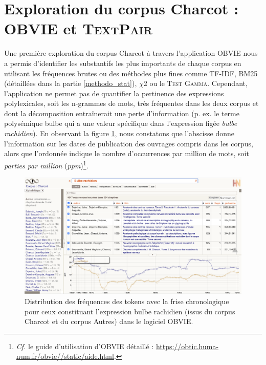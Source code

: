 \label{resultats}
\section{Exploration du corpus Charcot : \textsc{OBVIE} et \textsc{TextPair}}
Une première exploration du corpus Charcot à travers l'application OBVIE nous a permis d'identifier les substantifs les plus importants de chaque corpus en utilisant les fréquences brutes ou des méthodes plus fines comme \textsc{TF-IDF}, \textsc{BM25} (détaillées dans la partie \ref{methodo_stat}), \textsc{$\chi$2} ou le \textsc{Test Gamma}. Cependant, l'application ne permet pas de quantifier la pertinence des expressions polylexicales, soit les n-grammes de mots, très fréquentes dans les deux corpus et dont la décomposition entraînerait une perte d'information (p. ex. le terme polysémique \og{}bulbe\fg{} qui a une valeur spécifique dans l'expression figée \textit{bulbe rachidien}). En observant la figure \ref{fig:bulbe}, nous constatons que l'abscisse donne l'information sur les dates de publication des ouvrages compris dans les corpus, alors que l'ordonnée indique le nombre d'occurrences par million de mots, soit \textit{parties par million} (\textit{ppm})\footnote{\textit{Cf.} le guide d'utilisation d'\textsc{OBVIE} détaillé : \url{https://obtic.huma-num.fr/obvie//static/aide.html}.}. 
\begin{figure}[!ht]
    \centering
    \includegraphics[width=1\textwidth]{img/bulbe_rachidien_mini.png}
    \caption{Distribution des fréquences des tokens avec la frise chronologique pour ceux constituant l'expression \og{}bulbe rachidien\fg{} (issus du corpus \og{}Charcot\fg{} et du corpus \og{}Autres\fg{}) dans le logiciel OBVIE.
    }
    \label{fig:bulbe}
\end{figure}


